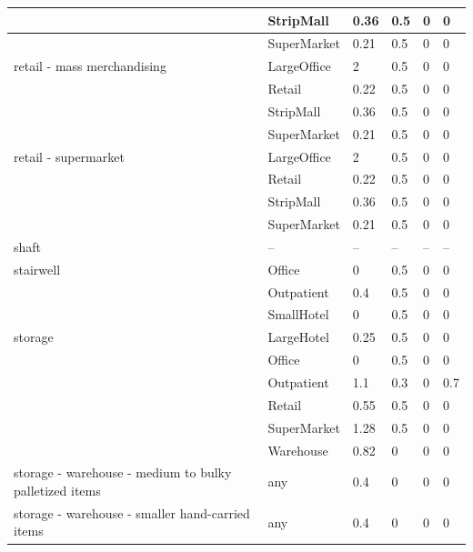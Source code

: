 \begin{center}
\begin{longtable}{|p{2.2in}|p{1.3in}|p{0.7in}|p{0.6in}|p{0.6in}|p{0.6in}|}
 & StripMall & 0.36 & 0.5 & 0 & 0 \\ \hline
 & SuperMarket & 0.21 & 0.5 & 0 & 0 \\ \hline
retail - mass merchandising & LargeOffice & 2 & 0.5 & 0 & 0 \\ \hline
 & Retail & 0.22 & 0.5 & 0 & 0 \\ \hline
 & StripMall & 0.36 & 0.5 & 0 & 0 \\ \hline
 & SuperMarket & 0.21 & 0.5 & 0 & 0 \\ \hline
retail - supermarket & LargeOffice & 2 & 0.5 & 0 & 0 \\ \hline
 & Retail & 0.22 & 0.5 & 0 & 0 \\ \hline
 & StripMall & 0.36 & 0.5 & 0 & 0 \\ \hline
 & SuperMarket & 0.21 & 0.5 & 0 & 0 \\ \hline
shaft & -- & -- & -- & -- & -- \\ \hline
stairwell & Office & 0 & 0.5 & 0 & 0 \\ \hline
 & Outpatient & 0.4 & 0.5 & 0 & 0 \\ \hline
 & SmallHotel & 0 & 0.5 & 0 & 0 \\ \hline
storage & LargeHotel & 0.25 & 0.5 & 0 & 0 \\ \hline
 & Office & 0 & 0.5 & 0 & 0 \\ \hline
 & Outpatient & 1.1 & 0.3 & 0 & 0.7 \\ \hline
 & Retail & 0.55 & 0.5 & 0 & 0 \\ \hline
 & SuperMarket & 1.28 & 0.5 & 0 & 0 \\ \hline
 & Warehouse & 0.82 & 0 & 0 & 0 \\ \hline
storage - warehouse - medium to bulky palletized items & any & 0.4 & 0 & 0 & 0 \\ \hline
storage - warehouse - smaller hand-carried items & any & 0.4 & 0 & 0 & 0 \\ \hline
\end{longtable}
\end{center}
